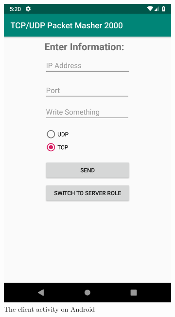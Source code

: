 \begin{figure}[H]
	\centering
	\begin{subfigure}{.49\textwidth}
		\centering
		\includegraphics[width=0.75\linewidth]{images/task1/clientAndroid.png}
		\caption{The client activity on Android}
		\label{fig:clientAndroid}
	\end{subfigure}%
	\begin{subfigure}{.49\textwidth}
		\centering

\end{subfigure}
\end{figure}
